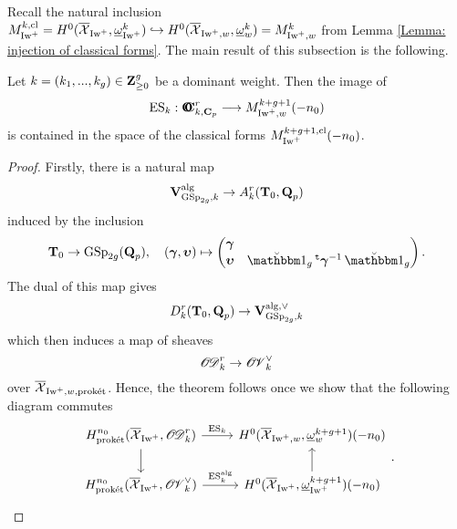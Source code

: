 Recall the natural inclusion $M^{k, \mathrm{cl}}_{\operatorname{Iw}^+}=H^0(\overline{\operatorname{\mathcal{X}}}_{\operatorname{Iw}^+}, \underline{\omega}_{\operatorname{Iw}^+}^k)\hookrightarrow H^0(\overline{\operatorname{\mathcal{X}}}_{\operatorname{Iw}^+, w}, \underline{\omega}_w^k) = M_{\operatorname{Iw}^+, w}^{k}$ from Lemma \ref{Lemma: injection of classical forms}. The main result of this subsection is the following.

\begin{Theorem}\label{thm:imageclassicalweight}
Let $k = (k_1, ..., k_g) \in \operatorname{\mathbf{Z}}_{\geq 0}^g$ be a dominant weight. Then the image of
$$\operatorname{ES}_{k}: \operatorname{\mathbf{O}\!\!\!\!\mathbf{C}}^r_{k, \operatorname{\mathbf{C}}_p}  \longrightarrow M^{k+g+1}_{\operatorname{Iw}^+, w}(-n_0)$$
is contained in the space of the classical forms $M^{k+g+1, \operatorname{cl}}_{\operatorname{Iw}^+}(-n_0)$.
\end{Theorem}
\begin{proof}
Firstly, there is a natural map \[
\operatorname{\mathbf{V}}_{\operatorname{GSp}_{2g}, k}^{\operatorname{alg}} \rightarrow A^{r}_{k}(\operatorname{\mathbf{T}}_0, \operatorname{\mathbf{Q}}_p)
\]
induced by the inclusion \[
    \T_0 \rightarrow \GSp_{2g}(\Q_p), \quad (\bfgamma, \bfupsilon)\mapsto \begin{pmatrix}\bfgamma & \\ \bfupsilon & \oneanti_g \trans\bfgamma^{-1}\oneanti_g\end{pmatrix}.
\] The dual of this map gives
\[
D_k^r(\operatorname{\mathbf{T}}_0, \operatorname{\mathbf{Q}}_p)\rightarrow \operatorname{\mathbf{V}}^{\operatorname{alg}, \vee}_{\operatorname{GSp}_{2g},k}
\]
which then induces a map of sheaves \[
    \operatorname{\operatorname{\mathscr{O}}\!\!\operatorname{\mathscr{D}}}_{k}^r \rightarrow \operatorname{\operatorname{\mathscr{O}}\!\!\operatorname{\mathscr{V}}}_{k}^{\vee}
\] over $\overline{\operatorname{\mathcal{X}}}_{\operatorname{Iw}^+, w, \operatorname{\textrm{prok\'{e}t}}}$. Hence, the theorem follows once we show that the following diagram commutes
$$
\begin{tikzcd}
H_{\proket}^{n_0}(\overline{\calX}_{\Iw^+}, \sheafOD_{k}^r)\arrow[d]\arrow[r, "\ES_{k}"]  & H^0(\overline{\calX}_{\Iw^+, w}, \underline{\omega}_w^{k+g+1})(-n_0)   \\
 H_{\proket}^{n_0}(\overline{\calX}_{\Iw^+}, \sheafOV_{k}^{\vee}) \arrow[r, "\ES_k^{\alg}"] & H^0(\overline{\calX}_{\Iw^+}, \underline{\omega}_{\Iw^+}^{ k+g+1})(-n_0) \arrow[u]
\end{tikzcd}.
$$


\end{proof}
